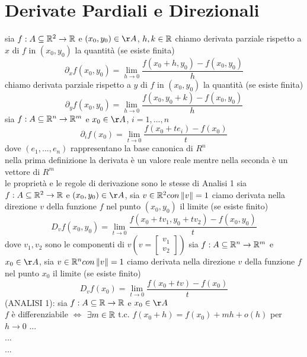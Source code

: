 \section{Derivate Pardiali e Direzionali}
sia $f:A\subseteq\mathbb{R}^2\rightarrow\mathbb{R}$ e $(x_0,y_0)\in\AA$, $h,k\in\mathbb{R}$
chiamo derivata parziale rispetto a $x$ di $f$ in $(x_0,y_0)$ la quantità (se esiste finita)
$$\partial_xf(x_0,y_0) = \lim\limits_{h\rightarrow{0}}\frac{f(x_0+h,y_0)-f(x_0,y_0)}{h}$$
chiamo derivata parziale rispetto a $y$ di $f$ in $(x_0,y_0)$ la quantità (se esiste finita)
$$\partial_yf(x_0,y_0) = \lim\limits_{h\rightarrow{0}}\frac{f(x_0,y_0+k)-f(x_0,y_0)}{h}$$
sia $f:A\subseteq\mathbb{R}^n\rightarrow\mathbb{R}^m$ e $x_0\in\AA$, $i=1,...,n$
$$\partial_if(x_0) = \lim\limits_{t\rightarrow{0}}\frac{f(x_0+te_i)-f(x_0)}{t}$$
dove $(e_1,...,e_n)$ rappresentano la base canonica di $R^n$\\
\observation nella prima definizione la derivata è un valore reale mentre nella seconda è un vettore di $R^m$\\
\observation le proprietà e le regole di derivazione sono le stesse di Analisi 1
sia $f:A\subseteq\mathbb{R}^2\rightarrow\mathbb{R}$ e $(x_0,y_0)\in\AA$, sia $v\in\mathbb{R}^2 con \left\| v\right\|=1 $
ciamo derivata nella direzione $v$ della funzione $f$ nel punto $(x_0,y_0)$ il limite (se esiste finito)\\
$$D_vf(x_0,y_0) = \lim\limits_{t\rightarrow{0}}\frac{f(x_0+tv_1,y_0+tv_2)-f(x_0,y_0)}{t}$$
dove $v_1,v_2$ sono le componenti di $v(v=\begin{bmatrix}v_1\\v_2\end{bmatrix})$
sia $f:A\subseteq\mathbb{R}^n\rightarrow\mathbb{R}^m$ e $x_0\in\AA$, sia $v\in\mathbb{R}^n con \left\| v\right\|=1 $
ciamo derivata nella direzione $v$ della funzione $f$ nel punto $x_0$ il limite (se esiste finito)\\
$$D_vf(x_0) = \lim\limits_{t\rightarrow{0}}\frac{f(x_0+tv)-f(x_0)}{t}$$
\proposition
(ANALISI 1): sia $f:A\subseteq \mathbb{R}\rightarrow\mathbb{R}$ e $x_0\in\AA$\\
$f$ è differenziabile $\Leftrightarrow$ $\exists m\in \mathbb{R} $ t.c. $f(x_0+h)=f(x_0)+mh+o(h)$ per $h\rightarrow 0$
...\\
...\\
...\\

